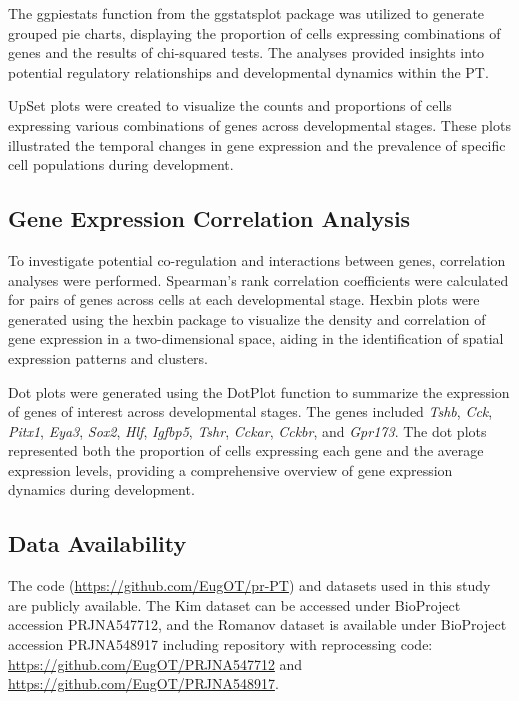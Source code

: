 \documentclass[
  number,
  preprint]{elsarticle}
\begin{document}
The ggpiestats function from the ggstatsplot package\citep{patil2021}
was utilized to generate grouped pie charts, displaying the proportion
of cells expressing combinations of genes and the results of chi-squared
tests. The analyses provided insights into potential regulatory
relationships and developmental dynamics within the PT.

UpSet plots\citep{conwayUpSetRPackageVisualization2017} were created to
visualize the counts and proportions of cells expressing various
combinations of genes across developmental stages. These plots
illustrated the temporal changes in gene expression and the prevalence
of specific cell populations during development.

\subsection{Gene Expression Correlation
Analysis}\label{gene-expression-correlation-analysis}

To investigate potential co-regulation and interactions between genes,
correlation analyses were performed. Spearman's rank correlation
coefficients were calculated for pairs of genes across cells at each
developmental stage. Hexbin plots were generated using the hexbin
package to visualize the density and correlation of gene expression in a
two-dimensional space, aiding in the identification of spatial
expression patterns and clusters.

Dot plots were generated using the DotPlot function to summarize the
expression of genes of interest across developmental stages. The genes
included \emph{Tshb}, \emph{Cck}, \emph{Pitx1}, \emph{Eya3},
\emph{Sox2}, \emph{Hlf}, \emph{Igfbp5}, \emph{Tshr}, \emph{Cckar},
\emph{Cckbr}, and \emph{Gpr173}. The dot plots represented both the
proportion of cells expressing each gene and the average expression
levels, providing a comprehensive overview of gene expression dynamics
during development.

\subsection{Data Availability}\label{data-availability}

The code (\url{https://github.com/EugOT/pr-PT}) and datasets used in
this study are publicly available. The Kim\citep{kim2020} dataset can be
accessed under BioProject accession PRJNA547712, and the
Romanov\citep{romanovMolecularDesignHypothalamus2020} dataset is
available under BioProject accession PRJNA548917 including repository
with reprocessing code: \url{https://github.com/EugOT/PRJNA547712} and
\url{https://github.com/EugOT/PRJNA548917}.


\renewcommand\refname{References}
  
\end{document}
